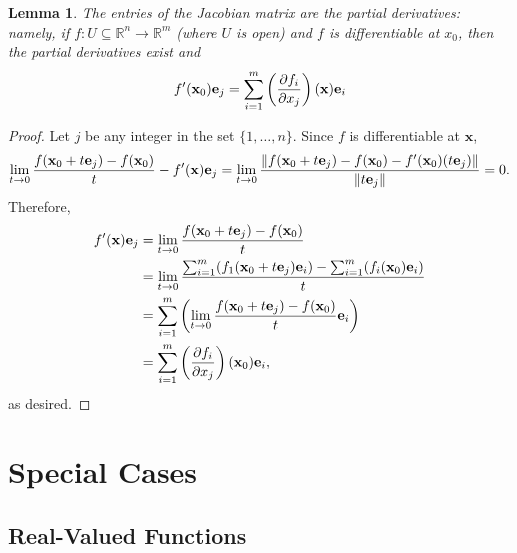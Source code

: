 \documentclass[11pt]{article}
\newtheorem*{lemma*}{Lemma}
\renewcommand{\vec}[1]{\mathbf{#1}}
\begin{document}
\begin{adjustwidth}{1cm}{}
	\begin{lemma*}
		The entries of the Jacobian matrix are the partial derivatives: namely, if $f: U \subseteq \mathbb{R}^{n} \to \mathbb{R}^{m}$ (where $U$ is open) and $f$ is differentiable at $x_{0}$, then the partial derivatives exist and 
		\[
			f'(\vec{x}_{0}) \vec{e}_{j} = \sum_{i = 1}^{m}\left(\pdv{f_{i}}{x_{j}}\right) (\vec{x})\vec{e}_{i} 
		\]
	\end{lemma*}
    \begin{proof}\renewcommand{\qedsymbol}{}
		Let $j$ be any integer in the set $\{ 1, \ldots, n \}$. Since $f$ is differentiable at $\vec{x}$,
		\[
			\lim\limits_{t \to 0} \frac{f(\vec{x}_{0} + t \vec{e}_{j}) - f(\vec{x}_{0})}{t} - f'(\vec{x}) \vec{e}_{j} = \lim\limits_{t \to 0} \frac{\norm{f(\vec{x}_{0} + t \vec{e}_{j}) - f(\vec{x}_{0}) - f'(\vec{x}_{0})(t \vec{e}_{j})}}{\norm{t \vec{e}_{j}}} = 0.
		\]
		Therefore,
		\begin{align*}
			f'(\vec{x}) \vec{e}_{j} &= \lim\limits_{t \to 0} \frac{f(\vec{x}_{0} + t \vec{e}_{j}) -   f(\vec{x}_{0})}{t} \\
			&= \lim\limits_{t \to 0} \frac{\sum_{i = 1}^{m} (f_{1}(\vec{x}_{0} + t \vec{e}_{j})\vec{e}_{i}) - \sum_{i = 1}^{m} (f_{i}(\vec{x}_{0})\vec{e}_{i})}{t} \\
			&= \sum_{i = 1}^{m} \left(\lim\limits_{t \to 0} \frac{f(\vec{x}_{0} + t \vec{\vec{e}}_{j}) - f(\vec{x}_{0})}{t} \vec{e}_{i}\right) \\
			&= \sum_{i = 1}^{m} \left(\pdv{f_{i}}{x_{j}}\right) (\vec{x}_{0}) \vec{e}_{i},
		\end{align*}
		as desired.
	\end{proof}
\end{adjustwidth}


\section{Special Cases}

\subsection{Real-Valued Functions} 
\end{document}
